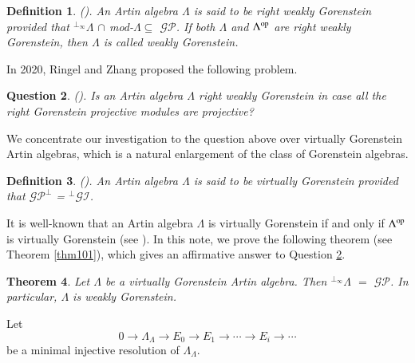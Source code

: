 \documentclass[11pt,a4paper]{article}
\newtheorem{thm}{Theorem}[section]
\newtheorem{que}[thm]{Question}
\newtheorem{defn}[thm]{Definition}
\begin{document}
\begin{defn} \label{defn82} \rm{   (\cite{rz1}).
 An Artin algebra $\Lambda$  is said to be   {\it right  weakly Gorenstein} provided that $^{\perp_{\infty}}{\Lambda} $ $\cap$ mod-$\Lambda \subseteq$ $\mathscr{GP}$.
 If both  $\Lambda$ and $\Lambda^{{\rm op}}$ are right  weakly Gorenstein,   then $\Lambda$  is called {\it   weakly Gorenstein}. }\end{defn}

In 2020, Ringel and  Zhang \cite{rz1} proposed the following problem.

\begin{que} \label{que1} { \rm   (\cite[Question 9.2]{rz1})}.
Is  an Artin algebra $\Lambda$  right  weakly Gorenstein in case all the right Gorenstein  projective modules are   projective?\end{que}


We concentrate our investigation to  the       question  above over virtually Gorenstein  Artin algebras, which is a natural enlargement of the class of Gorenstein algebras.

\begin{defn}\label{defn21} { \rm   (\cite[Definition 8.1]{ber})}.   {\rm  An  Artin algebra $\Lambda$  is said to be}   virtually Gorenstein   {\rm provided that}   $\mathscr{GP}^\perp$ = $^\perp\mathscr{GI}$.
  \end{defn}

It is well-known that   an  Artin algebra $\Lambda$ is virtually Gorenstein  if and only if $\Lambda^{{\rm op}}$ is  virtually Gorenstein (see \cite[Theorem 8.7]{bel}).
In this note,  we prove the following theorem (see Theorem \ref{thm101}), which gives an affirmative answer to
  Question \ref{que1}.
 \begin{thm}\label{thm81} Let   $\Lambda$  be  a virtually Gorenstein  Artin algebra. Then  $^{\perp_{\infty}}{\Lambda} $ $=$  $\mathscr{GP}$.
 In particular,  $\Lambda$ is weakly Gorenstein.
 \end{thm}


Let
 $$ 0  \longrightarrow \Lambda_{\Lambda}
\longrightarrow
E_0 \longrightarrow E_1
\longrightarrow \cdots \longrightarrow E_i
\longrightarrow \cdots   $$ be a minimal  injective resolution of $\Lambda_{\Lambda}$.
\end{document}
